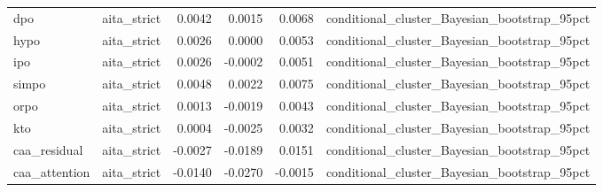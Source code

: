 \begin{tabular}{llrrrl}
dpo & aita\_strict & 0.0042 & 0.0015 & 0.0068 & conditional\_cluster\_Bayesian\_bootstrap\_95pct \\
hypo & aita\_strict & 0.0026 & 0.0000 & 0.0053 & conditional\_cluster\_Bayesian\_bootstrap\_95pct \\
ipo & aita\_strict & 0.0026 & -0.0002 & 0.0051 & conditional\_cluster\_Bayesian\_bootstrap\_95pct \\
simpo & aita\_strict & 0.0048 & 0.0022 & 0.0075 & conditional\_cluster\_Bayesian\_bootstrap\_95pct \\
orpo & aita\_strict & 0.0013 & -0.0019 & 0.0043 & conditional\_cluster\_Bayesian\_bootstrap\_95pct \\
kto & aita\_strict & 0.0004 & -0.0025 & 0.0032 & conditional\_cluster\_Bayesian\_bootstrap\_95pct \\
caa\_residual & aita\_strict & -0.0027 & -0.0189 & 0.0151 & conditional\_cluster\_Bayesian\_bootstrap\_95pct \\
caa\_attention & aita\_strict & -0.0140 & -0.0270 & -0.0015 & conditional\_cluster\_Bayesian\_bootstrap\_95pct \\
\bottomrule
\end{tabular}
